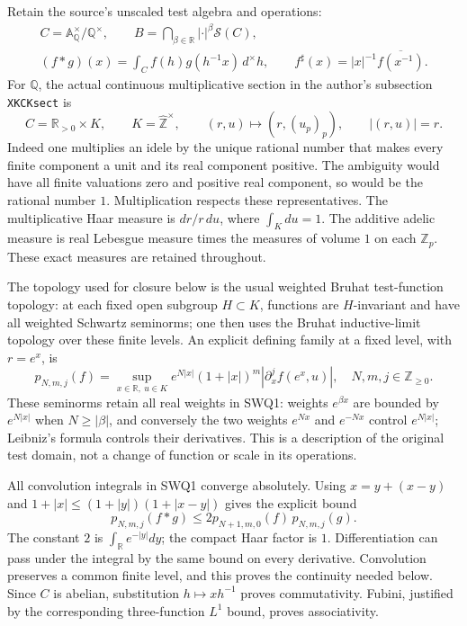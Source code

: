 Retain the source's unscaled test algebra and operations:
\begin{equation}\tag{SWQ1}
\begin{gathered}
 C=\mathbb A_{\mathbb Q}^{\times}/\mathbb Q^{\times},\qquad
 B=\bigcap_{\beta\in\mathbb R}|\cdot|^\beta\mathcal S(C),\\
 (f*g)(x)=\int_C f(h)g(h^{-1}x)\,d^{\times}h,\qquad
 f^{\sharp}(x)=|x|^{-1}\overline{f(x^{-1})}.
\end{gathered}
\end{equation}
For $\mathbb Q$, the actual continuous multiplicative section in
the author's subsection \texttt{XKCKsect} is
\begin{equation}\tag{SWQ2}
 C=\mathbb R_{>0}\times K,\qquad K=\widehat{\mathbb Z}^{\times},
 \qquad (r,u)\longmapsto(r,(u_p)_p),
 \qquad |(r,u)|=r.
\end{equation}
Indeed one multiplies an idele by the unique rational number that
makes every finite component a unit and its real component positive.
The ambiguity would have all finite valuations zero and positive real
component, so would be the rational number $1$. Multiplication
respects these representatives. The multiplicative Haar measure is
$dr/r\,du$, where $\int_Kdu=1$. The additive adelic measure is real
Lebesgue measure times the measures of volume $1$ on each
$\mathbb Z_p$. These exact measures are retained throughout.

The topology used for closure below is the usual weighted Bruhat
test-function topology: at each fixed open subgroup $H\subset K$,
functions are $H$-invariant and have all weighted Schwartz seminorms;
one then uses the Bruhat inductive-limit topology over these finite
levels. An explicit defining family at a fixed level, with $r=e^x$, is
\begin{equation}\tag{SWQ3}
 p_{N,m,j}(f)=\sup_{x\in\mathbb R,\ u\in K}
 e^{N|x|}(1+|x|)^m
 \left|\partial_x^j f(e^x,u)\right|,
 \quad N,m,j\in\mathbb Z_{\ge0}.
\end{equation}
These seminorms retain all real weights in SWQ1: weights $e^{\beta x}$
are bounded by $e^{N|x|}$ when $N\ge|\beta|$, and conversely the two
weights $e^{Nx}$ and $e^{-Nx}$ control $e^{N|x|}$; Leibniz's formula
controls their derivatives. This is a description of the original
test domain, not a change of function or scale in its operations.

All convolution integrals in SWQ1 converge absolutely. Using
$x=y+(x-y)$ and $1+|x|\le(1+|y|)(1+|x-y|)$ gives the explicit bound
\begin{equation}\tag{SWQ4}
 p_{N,m,j}(f*g)
 \le 2p_{N+1,m,0}(f)\,p_{N,m,j}(g).
\end{equation}
The constant $2$ is $\int_{\mathbb R}e^{-|y|}dy$; the compact Haar
factor is $1$. Differentiation can pass under the integral by the
same bound on every derivative. Convolution preserves a common
finite level, and this proves the continuity needed below. Since
$C$ is abelian, substitution $h\mapsto xh^{-1}$ proves commutativity.
Fubini, justified by the corresponding three-function $L^1$ bound,
proves associativity.

